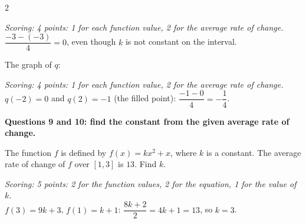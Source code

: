 \begin{multicols}{2}
\begin{minipage}{\linewidth}
\begin{exo}{}
\begin{solution}
\textit{Scoring: 4 points: 1 for each function value, 2 for the average rate of change.}\\
$\dfrac{-3-(-3)}{4}=0$, even though $k$ is not constant on the interval.
\end{solution}
\end{exo}
\end{minipage}\par\vspace{8pt}
\noindent\begin{minipage}{\linewidth}
\begin{exo}{}
The graph of $q$:
\ifkey\else\vspace{0.8cm}\fi
\begin{solution}
\textit{Scoring: 4 points: 1 for each function value, 2 for the average rate of change.}\\
$q(-2)=0$ and $q(2)=-1$ (the filled point): $\dfrac{-1-0}{4}=-\dfrac14$.
\end{solution}
\end{exo}
\end{minipage}\par\vspace{8pt}
\noindent\begin{minipage}{\linewidth}
\begin{center}\textsf{\small\bfseries\color{apnavy}Questions 9 and 10: find the constant from the given average rate of change.}\end{center}
\begin{exo}{}
The function $f$ is defined by $f(x)=kx^2+x$, where $k$ is a constant. The average rate of change of $f$ over $[1,3]$ is $13$. Find $k$.
\ifkey\else\vspace{1.6cm}\fi
\begin{solution}
\textit{Scoring: 5 points: 2 for the function values, 2 for the equation, 1 for the value of $k$.}\\
$f(3)=9k+3$, $f(1)=k+1$: $\dfrac{8k+2}{2}=4k+1=13$, so $k=3$.
\end{solution}
\end{exo}
\end{minipage}\par\vspace{8pt}
\noindent\begin{minipage}{\linewidth}

\end{minipage}
\end{multicols}
